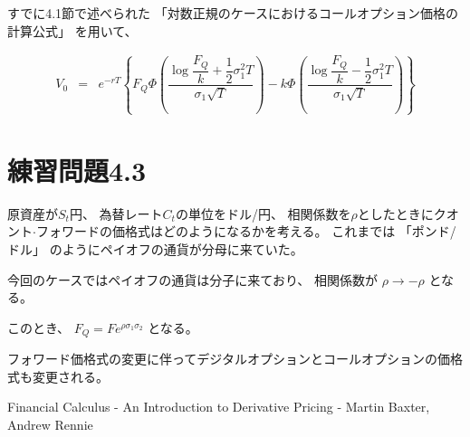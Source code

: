 \documentclass[uplatex,a4j,12pt,dvipdfmx]{jsarticle}
\begin{document}
すでに4.1節で述べられた
「対数正規のケースにおけるコールオプション価格の計算公式」
を用いて、

%
%
\begin{eqnarray}
	V_{0}
	&=&
	e^{-rT}
	\left\{
	F_{Q}
	\Phi
	\left(
	\dfrac{
		\log
		\dfrac{F_{Q}}{k}
		+
		\dfrac{1}{2} \sigma_{1}^{2} T
	}{\sigma_{1} \sqrt{T}}
	\right)
	-
	k
	\Phi
	\left(
	\dfrac{
		\log
		\dfrac{F_{Q}}{k}
		-
		\dfrac{1}{2} \sigma_{1}^{2} T
	}{\sigma_{1} \sqrt{T}}
	\right)
	\right\}
\end{eqnarray}
%
%


\section{練習問題4.3}
原資産が$S_{t}$円、
為替レート$C_{t}$の単位をドル/円、
相関係数を$\rho$としたときにクオント$\cdot$フォワードの価格式はどのようになるかを考える。
これまでは
「ポンド/ドル」
のようにペイオフの通貨が分母に来ていた。

今回のケースではペイオフの通貨は分子に来ており、
相関係数が
$\rho \to - \rho$
となる。

このとき、
$
	F_{Q}
	=
	F
	e^{\rho \sigma_{1} \sigma_{2}}
$
となる。

フォワード価格式の変更に伴ってデジタルオプションとコールオプションの価格式も変更される。

\begin{thebibliography}{9}
	Financial Calculus - An Introduction to Derivative Pricing - Martin Baxter, Andrew Rennie
\end{thebibliography}
\end{document}
